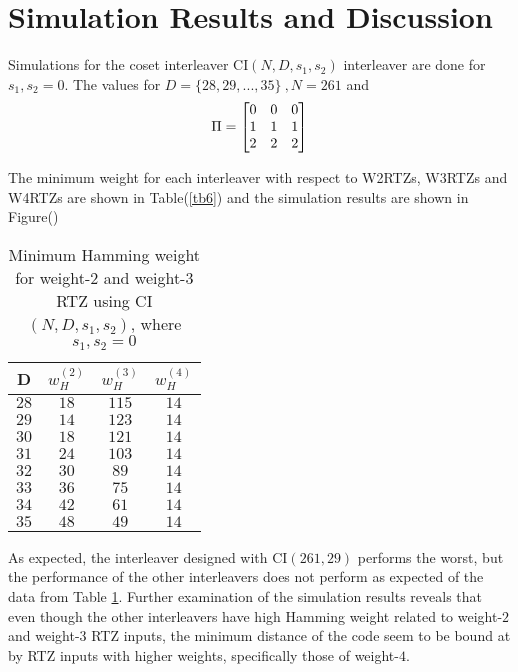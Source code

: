 \section{Simulation Results and Discussion}
Simulations for the coset interleaver CI$(N,D,s_1,s_2)$ interleaver are done for $s_1,s_2=0$. The values for $D=\{28,29,...,35\}~,N =261$ and $$\Pi =\begin{bmatrix} 0 & 0 & 0 \cr 1 & 1 & 1 \cr 2 & 2 & 2\end{bmatrix}$$

The minimum weight for each interleaver with respect to W2RTZs, W3RTZs and  W4RTZs are shown in Table(\ref{tb6}) and the simulation results are shown in Figure()
\begin{table}[h!]
\centering
\begin{tabular}{||c | c|c|c ||} 
 \hline
D &  $w_H^{(2)}$ &$w_H^{(3)}$ & $w_H^{(4)}$\\
 \hline\hline
 $28$ &$18$& $115$ & $14$\\
 \hline
 $29$ & $14$ & $123$ & $14$\\
 \hline
 $30$ & $18$ & $121$ & $14$\\
 \hline
 $31$ & $24$ & $103$ & $14$\\
 \hline
$32$ & $30$ & $89$ & $14$\\
 \hline
$33$ & $36$ & $75$ & $14$\\
 \hline
$34$ & $42$ & $61$ & $14$\\
 \hline
$35$ & $48$ & $49$ & $14$\\
 \hline\hline
\end{tabular}
\caption{Minimum Hamming weight for weight-$2$ and weight-$3$ RTZ using CI$(N,D,s_1,s_2)$, where $s_1,s_2=0$}
\label{tb4}
\end{table}
As expected, the interleaver designed with CI$(261,29)$ performs the worst, but the performance of the other interleavers does not perform as expected of the data from Table \ref{tb4}. Further examination of the simulation results reveals that even though the other interleavers have high Hamming weight related to weight-$2$ and weight-$3$ RTZ inputs, the minimum distance of the code seem to be bound at by RTZ inputs with higher weights, specifically those of weight-$4$. 

